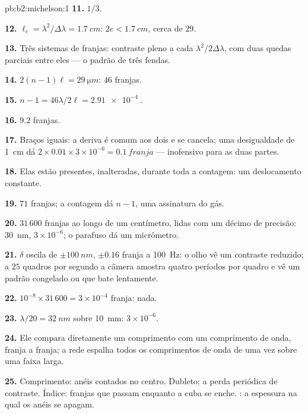 \begin{solution}{pb:b2:michelson:1}
\textbf{11.} $1/3$.

\textbf{12.} $\ell_c = \lambda^2/\Delta\lambda = \qty{1.7}{cm}$: $2e < \qty{1.7}{cm}$, cerca de $29$.

\textbf{13.} Três sistemas de franjas: contraste pleno a cada $\lambda^2/2\Delta\lambda$, com
duas quedas parciais entre eles --- o padrão de três fendas.

\textbf{14.} $2(n - 1)\ell = \qty{29}{\micro m}$: $46$ franjas.

\textbf{15.} $n - 1 = 46\lambda/2\ell = \qty{2.91e-4}{}$.

\textbf{16.} $9.2$ franjas.

\textbf{17.} Braços iguais: a deriva é comum aos dois e se cancela; uma
desigualdade de \qty{1}{cm} dá $2 \times 0.01 \times 3 \times 10^{-6} = \qty{0.1}{franja}$ ---
inofensivo para as duas partes.

\textbf{18.} Elas estão presentes, inalteradas, durante toda a contagem: um
deslocamento constante.

\textbf{19.} $71$ franjas; a contagem dá $n - 1$, uma assinatura do gás.

\textbf{20.} $31\,600$ franjas ao longo de um centímetro, lidas com um décimo de precisão:
\qty{30}{nm}, $3 \times 10^{-6}$; o parafuso dá um micrômetro.

\textbf{21.} $\delta$ oscila de $\pm\qty{100}{nm}$, $\pm0.16$ franja a \qty{100}{Hz}: o
olho vê um contraste reduzido; a $25$ quadros por segundo a câmera
amostra quatro períodos por quadro e vê um padrão congelado ou que bate
lentamente.

\textbf{22.} $10^{-8} \times 31\,600 = 3 \times 10^{-4}$ franja: nada.

\textbf{23.} $\lambda/20 = \qty{32}{nm}$ sobre \qty{10}{mm}: $3 \times 10^{-6}$.

\textbf{24.} Ele compara diretamente um comprimento com um comprimento de onda, franja a
franja; a rede espalha todos os comprimentos de onda de uma vez sobre uma faixa larga.

\textbf{25.} Comprimento: anéis contados no centro. Dubleto: a
perda periódica de contraste. Índice: franjas que passam enquanto a cuba
se enche. : a espessura na qual os anéis se apagam.
\end{solution}
